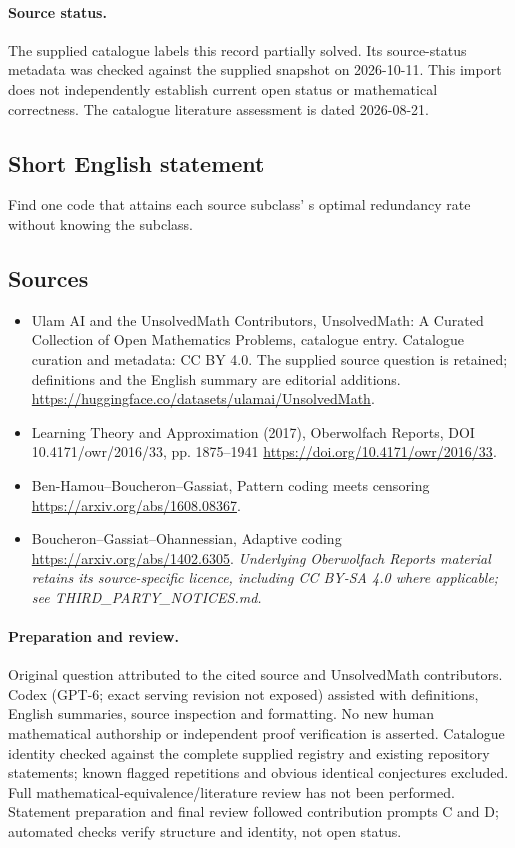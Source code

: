 \documentclass[11pt]{article}
\begin{document}
\paragraph{Source status.}
The supplied catalogue labels this record partially solved. Its source-status metadata was checked against the supplied snapshot on 2026-10-11. This import does not independently establish current open status or mathematical correctness. The catalogue literature assessment is dated 2026-08-21.
\subsection{Short English statement}
Find one code that attains each source subclass' s optimal redundancy rate without knowing the subclass.
\subsection{Sources}
\begin{itemize}
\item[\hypertarget{source:statement:1}{S1}] Ulam AI and the UnsolvedMath Contributors, UnsolvedMath: A Curated Collection of Open Mathematics Problems, catalogue entry. Catalogue curation and metadata: CC BY 4.0. The supplied source question is retained; definitions and the English summary are editorial additions.
\url{https://huggingface.co/datasets/ulamai/UnsolvedMath}.
\item[\hypertarget{source:statement:2}{S2}] Learning Theory and Approximation (2017), Oberwolfach Reports, DOI 10.4171/owr/2016/33, pp. 1875--1941
\url{https://doi.org/10.4171/owr/2016/33}.
\item[\hypertarget{source:statement:3}{S3}] Ben-Hamou--Boucheron--Gassiat, Pattern coding meets censoring
\url{https://arxiv.org/abs/1608.08367}.
\item[\hypertarget{source:statement:4}{S4}] Boucheron--Gassiat--Ohannessian, Adaptive coding
\url{https://arxiv.org/abs/1402.6305}.
\textit{Underlying Oberwolfach Reports material retains its source-specific licence, including CC BY-SA 4.0 where applicable; see THIRD\_PARTY\_NOTICES.md.}
\end{itemize}
\paragraph{Preparation and review.}
Original question attributed to the cited source and UnsolvedMath contributors. Codex (GPT-6; exact serving revision not exposed) assisted with definitions, English summaries, source inspection and formatting. No new human mathematical authorship or independent proof verification is asserted. Catalogue identity checked against the complete supplied registry and existing repository statements; known flagged repetitions and obvious identical conjectures excluded. Full mathematical-equivalence/literature review has not been performed. Statement preparation and final review followed contribution prompts C and D; automated checks verify structure and identity, not open status.
\label{end:statement}
\end{document}
